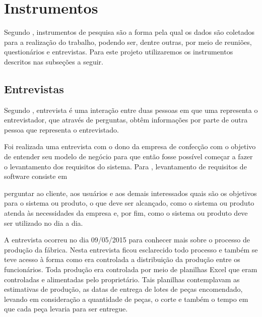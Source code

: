 \section{Instrumentos}

\par Segundo , instrumentos de pesquisa são a
forma pela qual os dados são coletados para a realização do trabalho, podendo ser,
dentre outras, por meio de reuniões, questionários e entrevistas. Para
este projeto utilizaremos os instrumentos descritos nas subseções a seguir.

\subsection{Entrevistas}
\par Segundo , entrevista é
uma interação entre duas pessoas em que uma representa o entrevistador, 
que através de perguntas, obtêm informações por parte de outra pessoa que
representa o entrevistado.





\par Foi realizada uma entrevista com o dono da empresa de confecção com o
objetivo de entender seu modelo de negócio para que então fosse possível começar
a fazer o levantamento dos requisitos do sistema. Para
, levantamento de requisitos de
software consiste em

\begin{citacao}
perguntar ao cliente, aos usuários e aos demais interessados quais são os
objetivos para o sistema ou produto, o que deve ser alcançado, como o sistema ou
produto atenda às necessidades da empresa e, por fim, como o sistema ou produto
deve ser utilizado no dia a dia.
\end{citacao} 

\par A entrevista ocorreu no dia 09/05/2015 para conhecer mais sobre o processo de 
produção da fábrica. Nesta entrevista ficou esclarecido todo processo e também se teve 
acesso à forma como era controlada a distribuição da produção entre os funcionários. Toda
produção era controlada por meio de planilhas Excel que eram
controladas e alimentadas pelo proprietário. Tais planilhas contemplavam as
estimativas de produção, as datas de entrega de lotes de peças encomendado,
levando em consideração a quantidade de peças, o corte e também o tempo em que cada peça levaria
para ser entregue.


